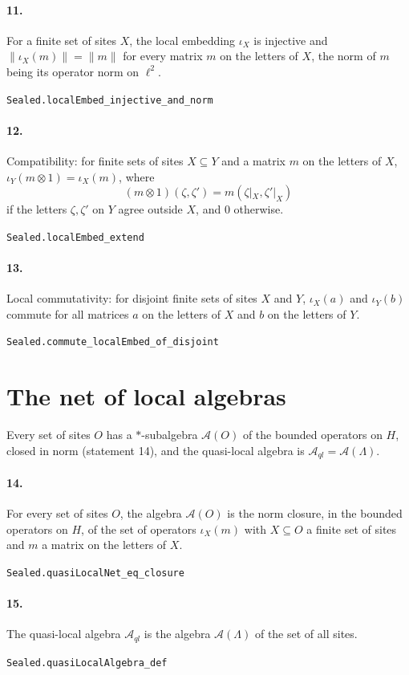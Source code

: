 \documentclass[11pt]{article}
\begin{document}
\paragraph{11.} For a finite set of sites $X$, the local embedding $\iota_X$ is injective and $\|\iota_X(m)\| = \|m\|$ for every matrix $m$ on the letters of $X$, the norm of $m$ being its operator norm on $\ell^2$.\par{\footnotesize\texttt{Sealed.localEmbed\_injective\_and\_norm}}

\paragraph{12.} Compatibility: for finite sets of sites $X \subseteq Y$ and a matrix $m$ on the letters of $X$, $\iota_Y(m \otimes 1) = \iota_X(m)$, where \[(m \otimes 1)(\zeta, \zeta') = m(\zeta|_X, \zeta'|_X)\] if the letters $\zeta, \zeta'$ on $Y$ agree outside $X$, and $0$ otherwise.\par{\footnotesize\texttt{Sealed.localEmbed\_extend}}

\paragraph{13.} Local commutativity: for disjoint finite sets of sites $X$ and $Y$, $\iota_X(a)$ and $\iota_Y(b)$ commute for all matrices $a$ on the letters of $X$ and $b$ on the letters of $Y$.\par{\footnotesize\texttt{Sealed.commute\_localEmbed\_of\_disjoint}}

\section*{The net of local algebras}
Every set of sites $O$ has a $*$-subalgebra $\mathcal A(O)$ of the bounded operators on $H$, closed in norm (statement 14), and the quasi-local algebra is $\mathcal A_{ql} = \mathcal A(\Lambda)$.

\paragraph{14.} For every set of sites $O$, the algebra $\mathcal A(O)$ is the norm closure, in the bounded operators on $H$, of the set of operators $\iota_X(m)$ with $X \subseteq O$ a finite set of sites and $m$ a matrix on the letters of $X$.\par{\footnotesize\texttt{Sealed.quasiLocalNet\_eq\_closure}}

\paragraph{15.} The quasi-local algebra $\mathcal A_{ql}$ is the algebra $\mathcal A(\Lambda)$ of the set of all sites.\par{\footnotesize\texttt{Sealed.quasiLocalAlgebra\_def}}
\end{document}
